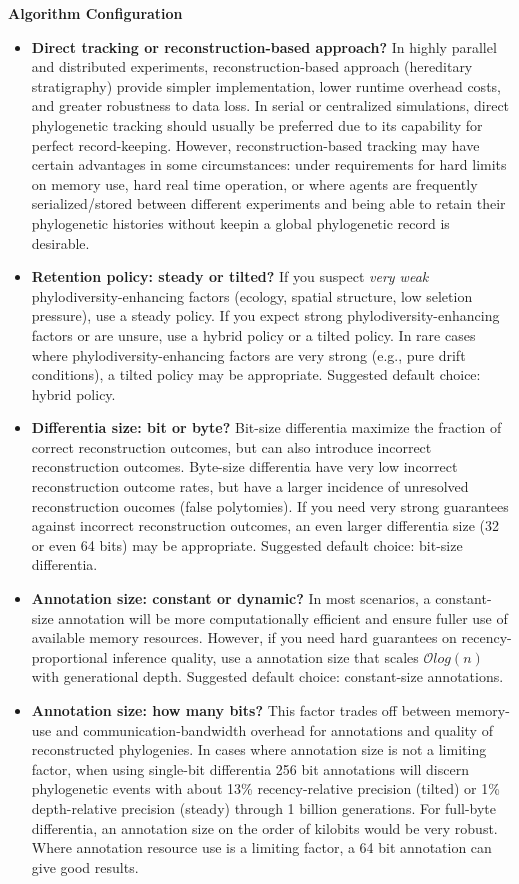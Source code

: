 \textbf{Algorithm Configuration}
\begin{itemize}
\item \textbf{Direct tracking or reconstruction-based approach?}
  In highly parallel and distributed experiments, reconstruction-based approach (hereditary stratigraphy) provide simpler implementation, lower runtime overhead costs, and greater robustness to data loss.
  In serial or centralized simulations, direct phylogenetic tracking should usually be preferred due to its capability for perfect record-keeping.
  However, reconstruction-based tracking may have certain advantages in some circumstances: under requirements for hard limits on memory use, hard real time operation, or where agents are frequently serialized/stored between different experiments and being able to retain their phylogenetic histories without keepin a global phylogenetic record is desirable.
\item \textbf{Retention policy: steady or tilted?} 
  If you suspect \textit{very weak} phylodiversity-enhancing factors (ecology, spatial structure, low seletion pressure), use a steady policy.
  If you expect strong phylodiversity-enhancing factors or are unsure, use a hybrid policy or a tilted policy.
  In rare cases where phylodiversity-enhancing factors are very strong (e.g., pure drift conditions), a tilted policy may be appropriate.
  Suggested default choice: hybrid policy.
\item \textbf{Differentia size: bit or byte?}
  Bit-size differentia maximize the fraction of correct reconstruction outcomes, but can also introduce incorrect reconstruction outcomes.
  Byte-size differentia have very low incorrect reconstruction outcome rates, but have a larger incidence of unresolved reconstruction oucomes (false polytomies).
  If you need very strong guarantees against incorrect reconstruction outcomes, an even larger differentia size (32 or even 64 bits) may be appropriate. 
  Suggested default choice: bit-size differentia.
\item \textbf{Annotation size: constant or dynamic?}
  In most scenarios, a constant-size annotation will be more computationally efficient and ensure fuller use of available memory resources.
  However, if you need hard guarantees on recency-proportional inference quality, use a annotation size that scales $\mathcal{O}log(n)$ with generational depth.
  Suggested default choice: constant-size annotations.
\item \textbf{Annotation size: how many bits?}
  This factor trades off between memory-use and communication-bandwidth overhead for annotations and quality of reconstructed phylogenies.
  In cases where annotation size is not a limiting factor, when using single-bit differentia 256 bit annotations will discern phylogenetic events with about 13\% recency-relative precision (tilted) or 1\% depth-relative precision (steady) through 1 billion generations.
  For full-byte differentia, an annotation size on the order of kilobits would be very robust.
  Where annotation resource use is a limiting factor, a 64 bit annotation can give good results.


\end{itemize}

